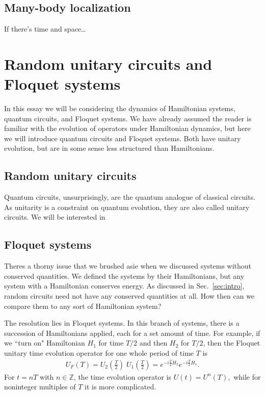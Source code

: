 \documentclass[a4paper,12pt]{article}
\newcommand{\note}[1]{{\color{red}{#1}}}
\begin{document}
\subsection{Many-body localization} \label{sub:mbl}

If there's time and space\dots


\section{Random unitary circuits and Floquet systems} \label{sec:circuits}

In this essay we will be considering the dynamics of Hamiltonian systems, quantum circuits, and Floquet systems. We have already assumed the reader is familiar with the evolution of operators under Hamiltonian dynamics, but here we will introduce quantum circuits and Floquet systems. Both have unitary evolution, but are in some sense less structured than Hamiltonians.

\note{Define ``physical" systems, disorder realization.}

\note{Haar measure}

\subsection{Random unitary circuits} \label{sub:ruc}

Quantum circuits, unsurprisingly, are the quantum analogue of classical circuits. As unitarity is a constraint on quantum evolution, they are also called unitary circuits. We will be interested in 

\subsection{Floquet systems} \label{sub:floq}

Theres a thorny issue that we brushed asie when we discussed systems without conserved quantities. We defined the systems by their Hamiltonians, but any system with a Hamiltonian conserves energy. As discussed in Sec.~\ref{sec:intro}, random circuits need not have any conserved quantities at all. How then can we compare them to any sort of Hamiltonian system?

The resolution lies in Floquet systems. In this branch of systems, there is a succession of Hamiltonians applied, each for a set amount of time. For example, if we ``turn on" Hamiltonian $H_1$ for time $T/2$ and then $H_2$ for $T/2$, then the Floquet unitary time evolution operator for one whole period of time $T$ is 
\begin{align}
U_F(T) = U_2\left(\frac{T}{2}\right)\; U_1\left(\frac{T}{2}\right) = e^{-i\frac{T}{2}H_2} e^{-i\frac{T}{2}H_1}.
\end{align}
For $t=nT$ with $n\in \mathbb{Z}$, the time evolution operator is $U(t)=U^n(T),$ while for noninteger multiples of $T$ it is more complicated. 
\end{document}
